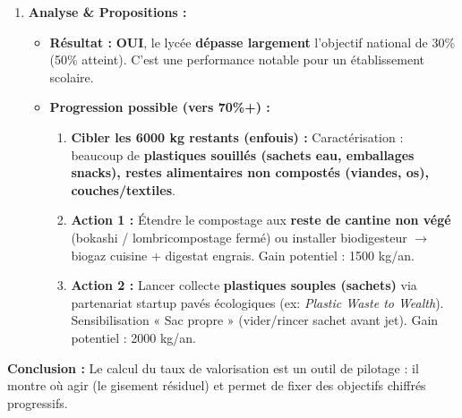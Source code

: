 \documentclass[11pt]{article}
\begin{document}
\begin{exoresolu}
\begin{enumerate}
    \item \textbf{Analyse \& Propositions :}
    \begin{itemize}
        \item \textbf{Résultat :} \textbf{OUI}, le lycée \textbf{dépasse largement} l'objectif national de 30\% (50\% atteint). C'est une performance notable pour un établissement scolaire.
        \item \textbf{Progression possible (vers 70\%+) :}
        \begin{enumerate}
            \item \textbf{Cibler les 6000 kg restants (enfouis) :} Caractérisation : beaucoup de \textbf{plastiques souillés (sachets eau, emballages snacks), restes alimentaires non compostés (viandes, os), couches/textiles}. 
            \item \textbf{Action 1 :} Étendre le compostage aux \textbf{reste de cantine non végé} (bokashi / lombricompostage fermé) ou installer biodigesteur $\rightarrow$ biogaz cuisine + digestat engrais. Gain potentiel : 1500 kg/an.
            \item \textbf{Action 2 :} Lancer collecte \textbf{plastiques souples (sachets)} via partenariat startup pavés écologiques (ex: \textit{Plastic Waste to Wealth}). Sensibilisation « Sac propre » (vider/rincer sachet avant jet). Gain potentiel : 2000 kg/an.
        \end{enumerate}
    \end{itemize}
\end{enumerate}
\textbf{Conclusion :} Le calcul du taux de valorisation est un outil de pilotage : il montre où agir (le gisement résiduel) et permet de fixer des objectifs chiffrés progressifs.
\end{exoresolu}
\end{document}
